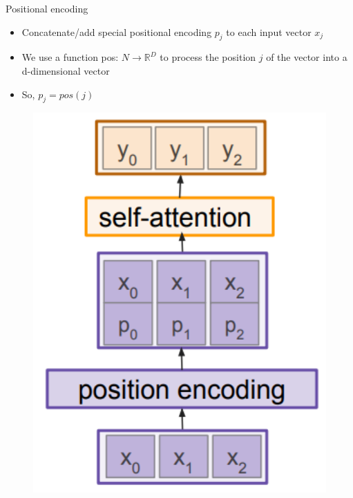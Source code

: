 \begin{frame}{Positional encoding}
\begin{itemize}
    \item Concatenate/add special positional encoding $p_j$ to each input vector $x_j$
    \item We use a function pos: $N \rightarrow \mathbb{R}^D$ to process the position $j$ of the vector into a d-dimensional vector
    \item So, $p_j = pos(j)$

\end{itemize}
\begin{figure}
\centering
\includegraphics[width=1.0\textwidth,height=0.6\textheight,keepaspectratio]{images/advanced-cv/attention_32.png}
\end{figure}

    
\end{frame}

